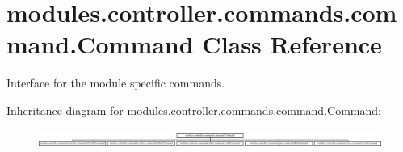 \hypertarget{classmodules_1_1controller_1_1commands_1_1command_1_1_command}{}\section{modules.\+controller.\+commands.\+command.\+Command Class Reference}
\label{classmodules_1_1controller_1_1commands_1_1command_1_1_command}


Interface for the module specific commands.  


Inheritance diagram for modules.\+controller.\+commands.\+command.\+Command\+:\begin{figure}[H]
\begin{center}
\leavevmode
\includegraphics[height=0.562814cm]{classmodules_1_1controller_1_1commands_1_1command_1_1_command}
\end{center}
\end{figure}
